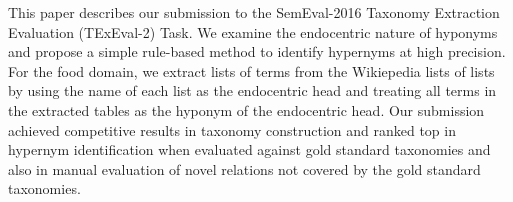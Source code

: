 This paper describes our submission to the SemEval-2016 Taxonomy Extraction Evaluation (TExEval-2) Task. We examine the endocentric nature of hyponyms and propose a simple rule-based method to identify hypernyms at high precision. For the food domain, we extract lists of terms from the Wikiepedia lists of lists by using the name of each list as the endocentric head and treating all terms in the extracted tables as the hyponym of the endocentric head. Our submission achieved competitive results in taxonomy construction and ranked top in hypernym identification when evaluated against gold standard taxonomies and also in manual evaluation of novel relations not covered by the gold standard taxonomies.
